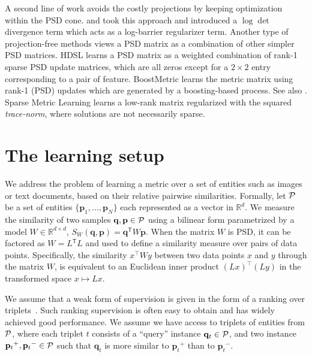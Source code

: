 \documentclass[twoside,11pt]{article}
\newcommand\mat[1]{{#1}}
\renewcommand\vec[1]{\mathbf{#1}}
\newcommand{\T}{{}^\mathsf{T}}
\newcommand{\W}{\mat{W}}
\newcommand{\Rd}{\mathbb{R}^d}
\newcommand{\ignore}[1]{}
\newcommand{\q}{{\vec{q}}}
\newcommand{\p}{{\vec{p}}}
\newcommand{\trip}{{t}}
\newcommand{\qt}{{\q_{\trip}}}
\newcommand{\pt}{{\p_{\trip}}}
\newcommand{\cholL}{\mat{L}}
\begin{document}
A second line of work avoids the costly projections by keeping optimization within the PSD cone. \citet{davis2007information} and \citet{lego} took this approach and introduced a $\log \det$ divergence term which acts as a log-barrier regularizer term. Another type of projection-free methods views a PSD matrix as a combination of other simpler PSD matrices. HDSL \citep{HDSL} learns a PSD matrix as a weighted combination of rank-1 sparse PSD update matrices, which are all zeros except for a $2\times2$ entry corresponding to a pair of feature. BoostMetric \citep{boost} learns the metric matrix using rank-1 (PSD) updates which are generated by a boosting-based process. See also \citet{bi2011adaboost, liu2012robust}. Sparse Metric Learning \citep{ying2009sparse} learns a low-rank matrix regularized with the squared \emph{trace-norm}, where solutions are not necessarily sparse.
\ignore{This yields low-rank but not truly sparse metrics. Their method also has a slower convergence rate, and is based on iteratively solving $|T|$-dimensional quadratic problems with linear constraints, where $|T|$ is the number of training triplets, as well as requiring a repeated full eigendecompositions.}

\vspace{-6pt}
\section{The learning setup}
\vskip -5pt
We address the problem of learning a metric over a set of
entities such as images or text documents, based on their
relative pairwise similarities. Formally, let $\cal{P}$ be a set of entities $\{\p_1,...,\p_N\}$ each represented as a vector in $\Rd$. We measure the similarity of two samples $\q, \p \in \cal{P}$ using a bilinear form parametrized by a model $\W \in \mathbb{R}^{d \times d}$, $S_{\W}(\q, \p) = \q\T \W \p$.
When the matrix $\W$ is PSD, it can be factored as $\W = \cholL\T \cholL$ and used to define a similarity measure over pairs of data points. Specifically, the similarity $x^\top\W y$ between two data points $x$ and $y$ through the matrix $\W$, is equivalent to an Euclidean inner product  $(\cholL x)^\top(\cholL y)$ in the transformed space $x \mapsto \cholL x$. 

We assume that a weak form of supervision is given in the form of a ranking over triplets~\citep{weinberger2006dml,OASIS,qian}. Such ranking supervision is often easy to obtain and has widely achieved good performance. We assume we have access to triplets of entities from $\cal{P}$, where each triplet $t$ consists of
a ``query'' instance $\qt \in \cal{P}$, and two instance $\pt^{+}, \pt^{-} \in \cal{P}$ such that $\qt$ is more similar to $\pt^{+}$
than to $\pt^{-}$.
\end{document}

